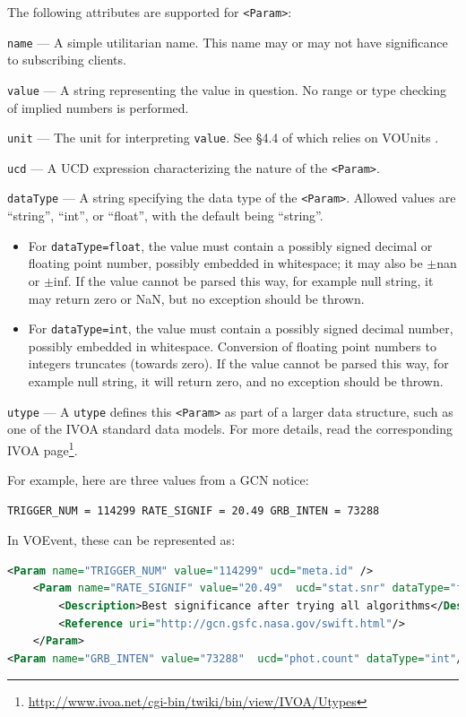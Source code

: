 \documentclass[11pt,a4paper]{ivoa}
\begin{document}
The following attributes are supported for {\tt <Param>}: 

 {\tt name}\label{sec:3.3.1.1} --- A simple utilitarian 
name. This name may or may not have significance to subscribing clients. 

 {\tt value}\label{sec:3.3.1.2} --- A string representing 
the value in question. No range or type checking of implied numbers is 
performed. 

 {\tt unit}\label{sec:3.3.1.3} --- The unit for 
interpreting {\tt value}. See \S4.4 of \citep{2019ivoa.spec.1021O}
which relies on VOUnits \citep{2014ivoa.spec.0523D}.

 {\tt ucd}\label{sec:3.3.1.4} --- A UCD 
\citep{2018ivoa.spec.0527P}
expression characterizing the nature of the {\tt <Param>}. 

 {\tt dataType}\label{sec:3.3.1.5} --- A string specifying 
the data type of the {\tt <Param>}. Allowed values are ``string'', ``int'', or 
``float'', with the default being ``string''. 
\begin{itemize}
\item For {\tt dataType=float}, the value must contain a possibly signed decimal 
or floating point number, possibly embedded in whitespace; it may also be 
$\pm$nan or $\pm$inf. If the value cannot be parsed this way, for example null 
string, it may return zero or NaN, but no exception should be thrown.
\item For {\tt dataType=int}, the value must contain a possibly signed decimal 
number, possibly embedded in whitespace. Conversion of floating point numbers to 
integers truncates (towards zero). If the value cannot be parsed this way, for 
example null string, it will return zero, and no exception should be thrown.
\end{itemize}

 {\tt utype}\label{sec:3.3.1.6} --- A {\tt utype} defines 
this {\tt <Param>} as part of a larger data structure, such as one of the IVOA 
standard data models. For more details, read the corresponding IVOA 
page\footnote{\url{http://www.ivoa.net/cgi-bin/twiki/bin/view/IVOA/Utypes}}. 

For example, here are three values from a GCN \citep{bib04} notice: 
\begin{lstlisting}[language=XML]
TRIGGER_NUM = 114299 RATE_SIGNIF = 20.49 GRB_INTEN = 73288 
\end{lstlisting}
In VOEvent, these can be represented as: 
\begin{lstlisting}[language=XML]
<Param name="TRIGGER_NUM" value="114299" ucd="meta.id" />
    <Param name="RATE_SIGNIF" value="20.49"  ucd="stat.snr" dataType="float">
        <Description>Best significance after trying all algorithms</Description>
        <Reference uri="http://gcn.gsfc.nasa.gov/swift.html"/>
    </Param>
<Param name="GRB_INTEN" value="73288"  ucd="phot.count" dataType="int"/> 
\end{lstlisting}
\end{document}
